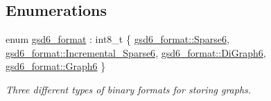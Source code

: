 \subsection*{Enumerations}
\begin{DoxyCompactItemize}
\item 
enum \hyperlink{namespacelgraph_1_1io_ad0917668d35430ffe13d455d687be4ff}{gsd6\+\_\+format} \+: int8\+\_\+t \{ \hyperlink{namespacelgraph_1_1io_ad0917668d35430ffe13d455d687be4ffaec6f468c732e372f3e518a35a9f0a084}{gsd6\+\_\+format\+::\+Sparse6}, 
\hyperlink{namespacelgraph_1_1io_ad0917668d35430ffe13d455d687be4ffaa08456aea2e82d44d7225c8058694d71}{gsd6\+\_\+format\+::\+Incremental\+\_\+\+Sparse6}, 
\hyperlink{namespacelgraph_1_1io_ad0917668d35430ffe13d455d687be4ffa216a4f5d733bff3751658293fd6bb407}{gsd6\+\_\+format\+::\+Di\+Graph6}, 
\hyperlink{namespacelgraph_1_1io_ad0917668d35430ffe13d455d687be4ffa2e43b93fa3f1c33bc0ca7890f2e9bb73}{gsd6\+\_\+format\+::\+Graph6}
 \}\begin{DoxyCompactList}\small\item\em Three different types of binary formats for storing graphs. \end{DoxyCompactList}
\end{DoxyCompactItemize}
